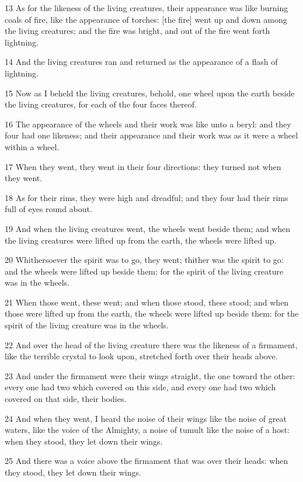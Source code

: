\par 13 As for the likeness of the living creatures, their appearance was like burning coals of fire, like the appearance of torches: [the fire] went up and down among the living creatures; and the fire was bright, and out of the fire went forth lightning.
\par 14 And the living creatures ran and returned as the appearance of a flash of lightning.
\par 15 Now as I beheld the living creatures, behold, one wheel upon the earth beside the living creatures, for each of the four faces thereof.
\par 16 The appearance of the wheels and their work was like unto a beryl: and they four had one likeness; and their appearance and their work was as it were a wheel within a wheel.
\par 17 When they went, they went in their four directions: they turned not when they went.
\par 18 As for their rims, they were high and dreadful; and they four had their rims full of eyes round about.
\par 19 And when the living creatures went, the wheels went beside them; and when the living creatures were lifted up from the earth, the wheels were lifted up.
\par 20 Whithersoever the spirit was to go, they went; thither was the spirit to go: and the wheels were lifted up beside them; for the spirit of the living creature was in the wheels.
\par 21 When those went, these went; and when those stood, these stood; and when those were lifted up from the earth, the wheels were lifted up beside them: for the spirit of the living creature was in the wheels.
\par 22 And over the head of the living creature there was the likeness of a firmament, like the terrible crystal to look upon, stretched forth over their heads above.
\par 23 And under the firmament were their wings straight, the one toward the other: every one had two which covered on this side, and every one had two which covered on that side, their bodies.
\par 24 And when they went, I heard the noise of their wings like the noise of great waters, like the voice of the Almighty, a noise of tumult like the noise of a host: when they stood, they let down their wings.
\par 25 And there was a voice above the firmament that was over their heads: when they stood, they let down their wings.
